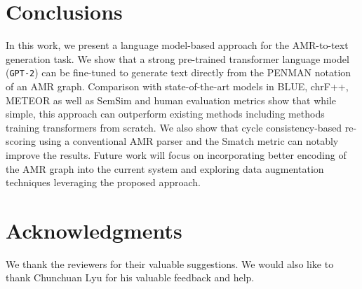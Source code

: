 \documentclass[11pt,a4paper]{article}
\newcommand{\GPT}{\texttt{GPT-2}}
\begin{document}
\section{Conclusions}

In this work, we present a language model-based approach for the AMR-to-text generation task. We show that a strong pre-trained transformer language model (\GPT) can be fine-tuned to generate text directly from the PENMAN notation of an AMR graph. Comparison with state-of-the-art models in BLUE, chrF++, METEOR as well as SemSim and human evaluation metrics show that while simple, this approach can outperform existing methods including methods training transformers from scratch. We also show that cycle consistency-based re-scoring using a conventional AMR parser and the Smatch metric can notably improve the results. Future work will focus on incorporating better encoding of the AMR graph into the current system and exploring data augmentation techniques leveraging the proposed approach.

\section*{Acknowledgments}

We thank the reviewers for their valuable suggestions. We would also like to thank Chunchuan Lyu for his valuable feedback and help.



\end{document}
